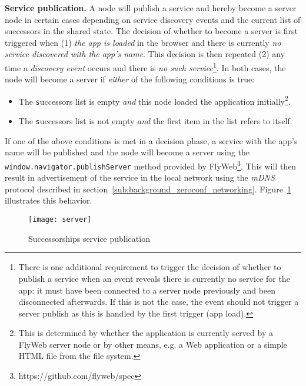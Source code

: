 \noindent\textbf{Service publication.}
A \APIshort node will publish a service and hereby become a server node in certain cases depending on service discovery events and the current list of successors in the shared state. The decision of whether to become a server is first triggered when (1) \textit{the app is loaded} in the browser and there is currently \textit{no service discovered with the app's name}. This decision is then repeated (2) any time a \textit{discovery event} occurs and there is \textit{no such service}\footnote{There is one additional requirement to trigger the decision of whether to publish a service when an event reveals there is currently no service for the app: it must have been connected to a server node previously and been disconnected afterwards. If this is not the case, the event should not trigger a server publish as this is handled by the first trigger (app load).}. In both cases, the node will become a server if \textit{either} of the following conditions is true:
\begin{itemize}
    \item The \texttt successors list is empty \textit{and} this node loaded the application initially\footnote{This is determined by whether the application is currently served by a FlyWeb server node or by other means, e.g. a Web application or a simple HTML file from the file system.}.
    \item The \texttt successors list is not empty \textit{and} the first item in the list refers to itself.
\end{itemize}

If one of the above conditions is met in a decision phase, a service with the app's name will be published and the node will become a server using the \texttt{window.navigator.publishServer} method provided by FlyWeb\footnote{https://github.com/flyweb/spec}. This will then result in advertisement of the service in the local network using the \textit{mDNS} protocol described in section~\ref{sub:background_zeroconf_networking}. Figure~\ref{fig:server} illustrates this behavior.

\begin{figure}[h]
    \centering
    \texttt{[image: server]}
    \caption{Successorships service publication}
    \label{fig:server}
\end{figure}

